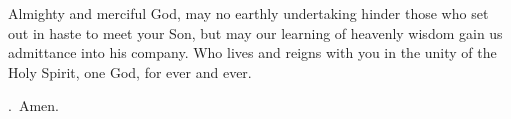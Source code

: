 \lettrine[lines=3]{A}{}lmighty and merciful God,
may no earthly undertaking hinder those
who set out in haste to meet your Son,
but may our learning of heavenly wisdom
gain us admittance into his company.
Who lives and reigns with you in the unity of the Holy Spirit,
one God, for ever and ever. \par \Rbar.~Amen.
